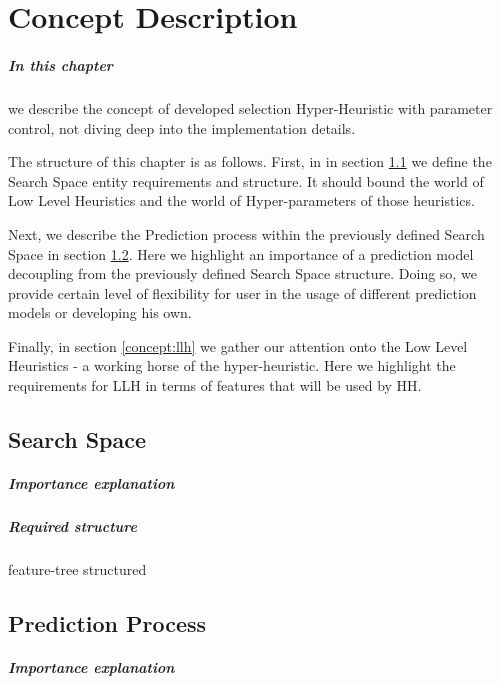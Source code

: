 \chapter{Concept Description}
\paragraph{In this chapter} we describe the concept of developed selection Hyper-Heuristic with parameter control, not diving deep into the implementation details.

The structure of this chapter is as follows.
First, in in section \ref{concept:search space} we define the Search Space entity requirements and structure. 
It should bound the world of Low Level Heuristics and the world of Hyper-parameters of those heuristics.


Next, we describe the Prediction process within the previously defined Search Space in section \ref{concept:prediction}.
Here we highlight an importance of a prediction model decoupling from the previously defined Search Space structure.
Doing so, we provide certain level of flexibility for user in the usage of different prediction models or developing his own.


Finally, in section \ref{concept:llh} we gather our attention onto the Low Level Heuristics - a working horse of the hyper-heuristic.
Here we highlight the requirements for LLH in terms of features that will be used by HH.


\section{Search Space}\label{concept:search space}
\paragraph{Importance explanation}
\paragraph{Required structure} feature-tree structured



\section{Prediction Process}\label{concept:prediction}
\paragraph{Importance explanation}
